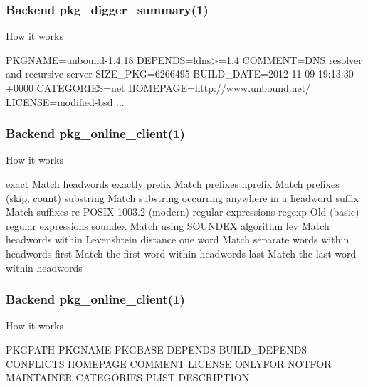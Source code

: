 \documentclass[hyperref=unicode,ascii,xcolor=dvipsnames]{beamer}
\begin{document}

\begin{frame}[fragile]
  \frametitle{Backend pkg\_digger\_summary(1)}
  \begin{block}{How it works}
    \begin{Code}{}
PKGNAME=unbound-1.4.18
DEPENDS=ldns>=1.4
COMMENT=DNS resolver and recursive server
SIZE\_PKG=6266495
BUILD\_DATE=2012-11-09 19:13:30 +0000
CATEGORIES=net
HOMEPAGE=http://www.unbound.net/
LICENSE=modified-bsd
...
\prompt{#}
    \end{Code}
  \end{block}
\end{frame}


\begin{frame}[fragile]
  \frametitle{Backend pkg\_online\_client(1)}
  \begin{block}{How it works}
    \small
    \begin{Code}{}
      exact    Match headwords exactly
     prefix    Match prefixes
    nprefix    Match prefixes (skip, count)
  substring    Match substring occurring anywhere
               in a headword
     suffix    Match suffixes
         re    POSIX 1003.2 (modern) regular expressions
     regexp    Old (basic) regular expressions
    soundex    Match using SOUNDEX algorithm
        lev    Match headwords within
               Levenshtein distance one
       word    Match separate words within headwords
      first    Match the first word within headwords
       last    Match the last word within headwords
\prompt{#}
    \end{Code}
  \end{block}
\end{frame}


\begin{frame}[fragile]
  \frametitle{Backend pkg\_online\_client(1)}
  \begin{block}{How it works}
    \begin{Code}{}
PKGPATH
PKGNAME
PKGBASE
DEPENDS
BUILD\_DEPENDS
CONFLICTS
HOMEPAGE
COMMENT
LICENSE
ONLYFOR
NOTFOR
MAINTAINER
CATEGORIES
PLIST
DESCRIPTION
\prompt{#}
    \end{Code}
  \end{block}
\end{frame}
\end{document}
